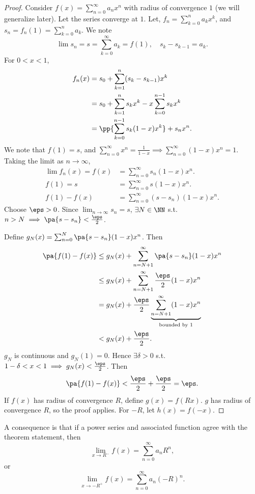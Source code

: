 \documentclass[11pt]{scrartcl}
\numberwithin{equation}{section}
\begin{document}
\begin{proof}
    Consider $f(x)=\sum_{n=0}^{\infty}a_nx^n$ with radius of convergence 
    $1$ (we will generalize later). Let the series converge at $1$. Let,
    $f_n=\sum_{k=0}^{n}a_kx^k$, and $s_n = f_n(1) = \sum_{k=0}^{n}a_k$.
    We note 
    \[
        \lim s_n=s=\sum_{k=0}^{\infty}a_k=f(1),\quad s_k-s_{k-1}=a_k.
    \]
    For $0<x<1$,
    \begin{align*}
        f_n(x)&=s_0+\sum_{k=1}^{n}(s_k-s_{k-1})x^k \\
        &= s_0+\sum_{k=1}^{n}s_kx^k - x \sum_{k=0}^{n-1}s_kx^k \\
        &= \pp{\sum_{k=0}^{n-1}s_k(1-x)x^k}+s_nx^n.
    \end{align*}
    We note that $f(1)=s$, and $\sum_{n=0}^{\infty}x^n=\frac{1}{1-x}
    \implies \sum_{n=0}^{\infty}(1-x)x^n=1$.
    Taking the limit as $n\to\infty$,
    \begin{align*}
        \lim f_n(x) = f(x) &= \sum_{n=0}^{\infty}s_n(1-x)x^n. \\ 
        f(1) = s &= \sum_{n=0}^{\infty}s(1-x)x^n.\\
        f(1)-f(x) &= \sum_{n=0}^{\infty}(s-s_n)(1-x)x^n.
    \end{align*}
    Choose $\eps>0$. Since $\lim_{n\rightarrow \infty}s_n=s$, 
    $\exists N\in\NN$ s.t. $n>N\implies \pa{s-s_n}<\frac{\eps}{2}$.

    Define $g_N(x)=\sum_{n=0}^{N}\pa{s-s_n}(1-x)x^n$.
    Then 
    \begin{align*}
        \pa{f(1)-f(x)} &\leq g_N(x) + \sum_{n=N+1}^{\infty}\pa{s-s_n}(1-x)x^n\\
        &\leq g_N(x) + \sum_{n=N+1}^{\infty}\frac{\eps}{2}(1-x)x^n \\
        &= g_N(x) + \frac{\eps}{2}\underbrace{\sum_{n=N+1}^{\infty}(1-x)x^n}_{\text{bounded by $1$}}\\
        &< g_N(x)+\frac{\eps}{2}.
    \end{align*}
    $g_N$ is continuous and $g_N(1)=0$. Hence $\exists \delta>0$ s.t. 
    $1-\delta<x<1\implies g_N(x)<\frac{\eps}{2}$.
    Then 
    \[
        \pa{f(1)-f(x)}<\frac{\eps}{2}+\frac{\eps}{2}=\eps.
    \]
    If $f(x)$ has radius of convergence $R$, define $g(x)=f(Rx)$.
    $g$ has radius of convergence $R$, so the proof applies.
    For $-R$, let $h(x)=f(-x)$.
\end{proof}

A consequence is that if a power series and associated function 
agree with the theorem statement, then 
\[
    \lim_{x\rightarrow R^-}f(x) = \sum_{n=0}^{\infty}a_nR^n,
\]
or
\[
    \lim_{x\rightarrow -R^+}f(x) = \sum_{n=0}^{\infty}a_n(-R)^n.
\]
\end{document}
